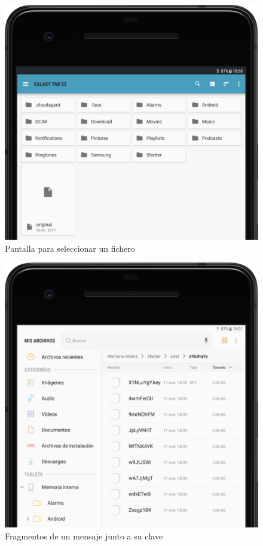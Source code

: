 \begin{figure}[!htb]
  \centering
  \includegraphics[scale=0.4]{Figures/file_picker}
  \decoRule
  \caption[Shatter (File Picker)]{Pantalla para seleccionar un fichero}
  \label{fig:file_picker}
\end{figure}

\begin{figure}[!htb]
  \centering
  \includegraphics[scale=0.4]{Figures/encfiles}
  \decoRule
  \caption[Shatter (Mensaje fragmentado)]{Fragmentos de un mensaje junto a su clave}
  \label{fig:encfiles}
\end{figure}

